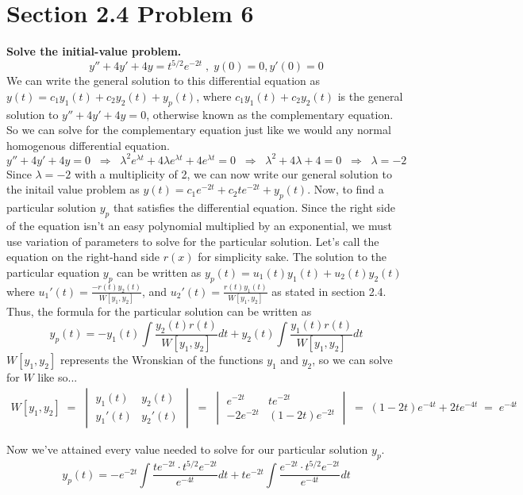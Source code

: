 \documentclass[11pt]{article}
\renewcommand{\l}{\lambda}
\begin{document}
 \section*{Section 2.4 Problem 6}
 \textbf{Solve the initial-value problem.}
 $$y'' + 4y' + 4y = t^{5/2}e^{-2t} \;,\; y(0) = 0, y'(0) = 0$$
 We can write the general solution to this differential equation as $y(t) = c_1y_1(t) + c_2y_2(t) + y_p(t)$, 
 where $c_1y_1(t) + c_2y_2(t)$ is the general solution to $y'' + 4y' + 4y = 0$, otherwise known as the 
 complementary equation.  So we can solve for the complementary equation just like we would any normal 
 homogenous differential equation.
 $$y'' + 4y' + 4y = 0 \;\;\Rightarrow\;\; \l^2e^{\l t} + 4\l e^{\l t} + 4e^{\l t} = 0 
 \;\;\Rightarrow\;\; \l^2 + 4\l + 4 = 0 \;\;\Rightarrow\;\; \l = -2$$
 Since $\l = -2$ with a multiplicity of 2, we can now write our general solution to the initail value problem
 as $y(t) = c_1e^{-2t} + c_2te^{-2t} + y_p(t)$.  Now, to find a particular solution $y_p$ that satisfies the 
 differential equation.  Since the right side of the equation isn't an easy polynomial multiplied by an 
 exponential, we must use variation of parameters to solve for the particular solution.  Let's call the equation 
 on the right-hand side $r(x)$ for simplicity sake.  The solution to the particular equation $y_p$ can be written 
 as $y_p(t) = u_1(t)y_1(t) + u_2(t)y_2(t)$ where 
 $u_1'(t) = \frac{-r(t)y_2(t)}{W[y_1,y_2]}$, and $u_2'(t) = \frac{r(t)y_1(t)}{W[y_1,y_2]}$ as stated in section 
 2.4.  Thus, the formula for the particular solution can be written as 
 $$y_p(t) = -y_1(t) \int \frac{y_2(t)r(t)}{W[y_1,y_2]}dt + y_2(t) \int \frac{y_1(t)r(t)}{W[y_1,y_2]}dt$$
 $W[y_1,y_2]$ represents the Wronskian of the functions $y_1$ and $y_2$, so we can solve for $W$ like so...
 \begin{align*}
 W[y_1,y_2] \;=\; \begin{vmatrix} y_1(t) & y_2(t) \\ y_1'(t) & y_2'(t) \end{vmatrix}
   \;=\; \begin{vmatrix} e^{-2t} & te^{-2t} \\ -2e^{-2t} & (1-2t)e^{-2t} \end{vmatrix}
  \;=\; (1-2t)e^{-4t} + 2te^{-4t} \;=\; e^{-4t}
 \end{align*}

 Now we've attained every value needed to solve for our particular solution $y_p$.
 $$y_p(t) = -e^{-2t} \int \frac{te^{-2t} \cdot t^{5/2}e^{-2t}}{e^{-4t}}dt
 + te^{-2t} \int \frac{e^{-2t} \cdot t^{5/2}e^{-2t}}{e^{-4t}}dt$$
\end{document}
